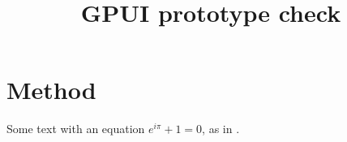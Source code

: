 \documentclass{article}
\title{GPUI prototype check}
\begin{document}
\maketitle

\section{Method}
Some text with an equation $e^{i\pi} + 1 = 0$, as in \cite{knuth1984}.


\end{document}
